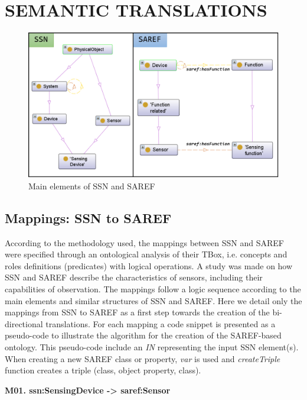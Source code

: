 \documentclass{sig-alternate-05-2015}
\begin{document}

\section{SEMANTIC TRANSLATIONS}
\begin{figure}[h!]
\centering
\includegraphics[scale=0.28]{SSN_SAREF_SensingDevice_Device}
\caption{Main elements of SSN and SAREF}
\label{fig:SSN_SAREF_SensingDevice_Device}
\end{figure}
\subsection{Mappings: SSN to SAREF}
According to the methodology used, the mappings between SSN and SAREF were specified through an ontological analysis of their TBox, i.e. concepts and roles definitions (predicates) with logical operations. A study was made on how SSN and SAREF describe the characteristics of sensors, including their capabilities of observation. The mappings follow a logic sequence according to the main elements and similar structures of SSN and SAREF. Here we detail only the mappings from SSN to SAREF as a first step towards the creation of the bi-directional translations. For each mapping a code snippet is presented as a pseudo-code to illustrate the algorithm for the creation of the SAREF-based ontology. This pseudo-code include an \textit{IN} representing the input SSN element(s). When creating a new SAREF class or property, \textit{var} is used and \textit{createTriple} function creates a triple (class, object property, class).

\noindent
\newline
\textbf{M01. ssn:\-SensingDevice -> saref:\-Sensor}
\end{document}
